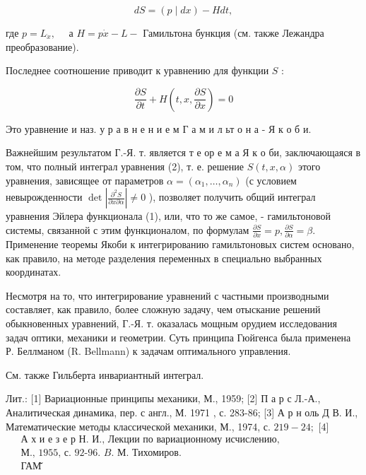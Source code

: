 \documentclass[10pt]{article}
\begin{document}
\[

d S=(p \mid d x)-H d t,

\]



где $p=L_{\dot{x}}, \quad$ а $H=p \dot{x}-L-$ Гамильтона бункция (см. также Лежандра преобразование).



Последнее соотношение приводит к уравнению для функции $S$ :



\[

\frac{\partial S}{\partial t}+H\left(t, x, \frac{\partial S}{\partial x}\right)=0

\]



Это уравнение и наз. у р а в н е н и е м Г а м и л ьт о н а - Я к о б и.



Важнейшим результатом Г.-Я. т. является т е ор е м а Я к о би, заключающаяся в том, что полный интеграл уравнения (2), т. е. решение $S(t, x, \alpha)$ этого уравнения, зависящее от параметров $\alpha=\left(\alpha_{1}, \ldots, \alpha_{n}\right)$ (с условием невырожденности $\operatorname{det}\left|\frac{\partial^{2} S}{\partial x \partial \alpha}\right| \neq 0$ ), позволяет получить общий интеграл уравнения Эйлера функционала (1), или, что то же самое, - гамильтоновой системы, связанной с этим функционалом, по формулам $\frac{\partial S}{\partial x}=p, \frac{\partial S}{\partial \alpha}=\beta$. Применение теоремы Якоби к интегрированию гамильтоновых систем основано, как правило, на методе разделения переменных в специально выбранных координатах.



Несмотря на то, что интегрирование уравнений с частными производными составляет, как правило, более сложную задачу, чем отыскание решений обыкновенных уравнений, Г.-Я. т. оказалась мощным орудием исследования задач оптики, механики и геометрии. Суть принципа Гюйгенса была применена Р. Беллманом (R. Bellmann) к задачам оптимального управления.



См. также Гильберта инвариантный интеграл.



Лит.: [1] Вариационные принципы механики, М., 1959; [2] П а р с Л.-А., Аналитическая динамика, пер. с англ., М. 1971 , с. 283-86; [3] А р н оль Д В. И., Математические методы классической механики, М., 1974, с. $219-24 ;$ [4] $\begin{aligned} & \text { А х и е з е р Н. И., Лекции по вариационному исчислению, } \\ & \text { М., 1955, с. 92-96. } B . \text { М. Тихомиров. } \\ & \text { ГАМ̆ }\end{aligned}$
\end{document}
